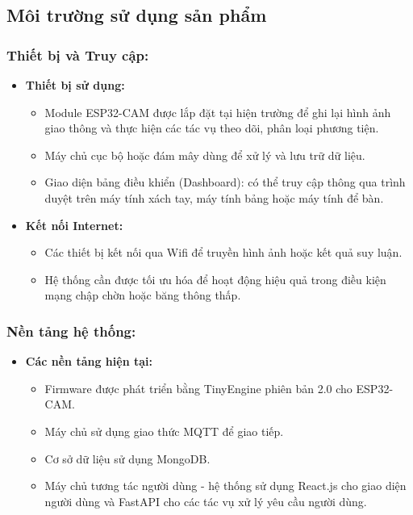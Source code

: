 \subsection{Môi trường sử dụng sản phẩm}
\subsubsection*{Thiết bị và Truy cập:}

\begin{itemize}


    \item \textbf{Thiết bị sử dụng:}
    \begin{itemize}
        \item Module ESP32-CAM được lắp đặt tại hiện trường để ghi lại hình ảnh giao thông và thực hiện các tác vụ theo dõi, phân loại phương tiện.
        \item Máy chủ cục bộ hoặc đám mây dùng để xử lý và lưu trữ dữ liệu.
        \item Giao diện bảng điều khiển (Dashboard): có thể truy cập thông qua trình duyệt trên máy tính xách tay, máy tính bảng hoặc máy tính để bàn.
    \end{itemize}


    \item \textbf{Kết nối Internet:}
    \begin{itemize}
        \item Các thiết bị kết nối qua Wifi để truyền hình ảnh hoặc kết quả suy luận.
        \item Hệ thống cần được tối ưu hóa để hoạt động hiệu quả trong điều kiện mạng chập chờn hoặc băng thông thấp.
    \end{itemize}
\end{itemize}

\subsubsection*{Nền tảng hệ thống:}

\begin{itemize}
    \item \textbf{Các nền tảng hiện tại:}
    \begin{itemize}
        \item Firmware được phát triển bằng TinyEngine phiên bản 2.0 cho ESP32-CAM.
        \item Máy chủ sử dụng giao thức MQTT để giao tiếp.
        \item Cơ sở dữ liệu sử dụng MongoDB.
        \item Máy chủ tương tác người dùng - hệ thống sử dụng React.js cho giao diện người dùng và FastAPI cho các tác vụ xử lý yêu cầu người dùng.
    \end{itemize}
\end{itemize}

